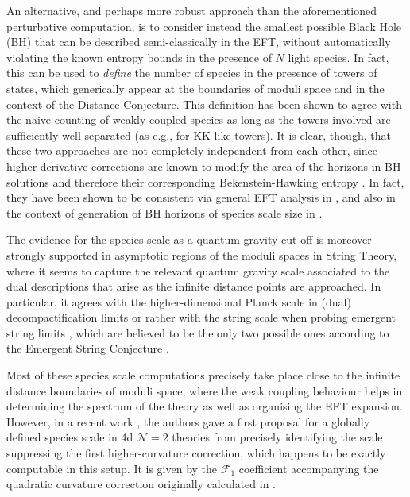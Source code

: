 An alternative, and perhaps more robust approach than the aforementioned perturbative computation, is to consider instead the smallest possible Black Hole (BH) that can be described semi-classically in the EFT, without automatically violating the known entropy bounds in the presence of $N$ light species. In fact, this can be used to \emph{define} the number of species in the presence of towers of states, which generically appear at the boundaries of moduli space and in the context of the Distance Conjecture. This definition has been shown to agree with the naive counting of weakly coupled species as long as the towers involved are sufficiently well separated (as e.g., for KK-like towers). It is clear, though, that these two approaches are not completely independent from each other, since higher derivative corrections are known to modify the area of the horizons in BH solutions and therefore their corresponding Bekenstein-Hawking entropy \cite{Sen:2005wa}. In fact, they have been shown to be consistent via general EFT analysis in \cite{vandeHeisteeg:2022btw}, and also in the context of generation of BH horizons of species scale size in \cite{Calderon-Infante:2023uhz}.

The evidence for the species scale as a quantum gravity cut-off is moreover strongly supported in asymptotic regions of the moduli spaces in String Theory, where it seems to capture the relevant quantum gravity scale associated to the dual descriptions that arise as the infinite distance points are approached. In particular, it agrees with the higher-dimensional Planck scale in (dual) decompactification limits or rather with the string scale when probing emergent string limits \cite{Castellano:2022bvr, vandeHeisteeg:2022btw, Calderon-Infante:2023ler}, which are believed to be the only two possible ones according to the Emergent String Conjecture \cite{Lee:2019wij}.

Most of these species scale computations precisely take place close to the infinite distance boundaries of moduli space, where the weak coupling behaviour helps in determining the spectrum of the theory as well as organising the EFT expansion. However, in a recent work \cite{vandeHeisteeg:2022btw}, the authors gave a first proposal for a globally defined species scale in 4d $\mathcal{N}=2$ theories from precisely identifying the scale suppressing the first higher-curvature correction, which happens to be exactly computable in this setup. It is given by the $\mathcal{F}_1$ coefficient accompanying the quadratic curvature correction originally calculated in \cite{Gopakumar:1998ii, Gopakumar:1998jq}.


